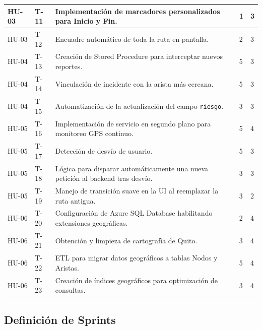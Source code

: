\begin{longtable}{|p{2cm}|p{2cm}|p{5cm}|p{2.2cm}|p{2.2cm}|}
HU-03 & T-11 &
Implementación de marcadores personalizados para Inicio y Fin. &
1 & 3 \\ \hline

HU-03 & T-12 &
Encuadre automático de toda la ruta en pantalla. &
2 & 3 \\ \hline

HU-04 & T-13 &
Creación de Stored Procedure para interceptar nuevos reportes. &
5 & 3 \\ \hline

HU-04 & T-14 &
Vinculación de incidente con la arista más cercana. &
5 & 3 \\ \hline

HU-04 & T-15 &
Automatización de la actualización del campo \texttt{riesgo}. &
3 & 3 \\ \hline

HU-05 & T-16 &
Implementación de servicio en segundo plano para monitoreo GPS continuo. &
5 & 4 \\ \hline

HU-05 & T-17 &
Detección de desvío de usuario. &
5 & 3 \\ \hline

HU-05 & T-18 &
Lógica para disparar automáticamente una nueva petición al backend tras desvío. &
3 & 3 \\ \hline

HU-05 & T-19 &
Manejo de transición suave en la UI al reemplazar la ruta antigua. &
3 & 2 \\ \hline

HU-06 & T-20 &
Configuración de Azure SQL Database habilitando extensiones geográficas. &
2 & 4 \\ \hline

HU-06 & T-21 &
Obtención y limpieza de cartografía de Quito. &
3 & 4 \\ \hline

HU-06 & T-22 &
ETL para migrar datos geográficos a tablas Nodos y Aristas. &
5 & 4 \\ \hline

HU-06 & T-23 &
Creación de índices geográficos para optimización de consultas. &
3 & 4 \\ \hline

\end{longtable}

\subsection{Definición de Sprints}

